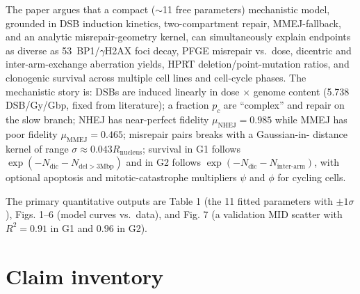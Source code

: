 \documentclass[11pt]{article}
\begin{document}
The paper argues that a compact ($\sim$11 free parameters) mechanistic
model, grounded in DSB induction kinetics, two-compartment repair,
MMEJ-fallback, and an analytic misrepair-geometry kernel, can
simultaneously explain endpoints as diverse as \SI{53}{BP1}/$\gamma$H2AX
foci decay, PFGE misrepair vs.\ dose, dicentric and inter-arm-exchange
aberration yields, HPRT deletion/point-mutation ratios, and clonogenic
survival across multiple cell lines and cell-cycle phases. The
mechanistic story is: DSBs are induced linearly in dose $\times$ genome
content (5.738 DSB/Gy/Gbp, fixed from literature); a fraction $p_c$ are
``complex'' and repair on the slow branch; NHEJ has near-perfect fidelity
$\mu_{\text{NHEJ}} = 0.985$ while MMEJ has poor fidelity
$\mu_{\text{MMEJ}} = 0.465$; misrepair pairs breaks with a Gaussian-in-
distance kernel of range $\sigma \approx 0.043 R_{\text{nucleus}}$;
survival in G1 follows $\exp(-N_{\text{dic}} - N_{\text{del}>3\text{Mbp}})$
and in G2 follows $\exp(-N_{\text{dic}} - N_{\text{inter-arm}})$, with
optional apoptosis and mitotic-catastrophe multipliers $\psi$ and $\phi$
for cycling cells.

The primary quantitative outputs are Table 1 (the 11 fitted parameters
with $\pm 1\sigma$), Figs. 1--6 (model curves vs.\ data), and Fig. 7
(a validation MID scatter with $R^2 = 0.91$ in G1 and $0.96$ in G2).

\section{Claim inventory}
\end{document}
